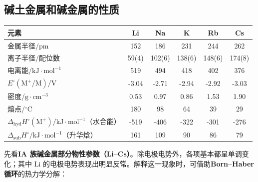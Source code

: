 \documentclass[UTF8]{ctexbook}
\begin{document}
\newpage
\subsection{碱土金属和碱金属的性质}



\noindent\begin{tabular*}{\textwidth}{@{\extracolsep{\fill}}lccccc@{}}
\toprule
元素 & Li & Na & K & Rb & Cs \\
\midrule
金属半径/pm & 152 & 186 & 231 & 244 & 262 \\
离子半径/配位数 & 59(4) & 102(6) & 138(6) & 148(6) & 174(8) \\
电离能/\(\mathrm{kJ\cdot mol^{-1}}\) & 519 & 494 & 418 & 402 & 376 \\
\(E^{\circ}(\mathrm{M^{+}/M})/\mathrm{V}\) & -3.04 & -2.71 & -2.94 & -2.92 & -3.03 \\
密度/\(\mathrm{g\cdot cm^{-3}}\) & 0.53 & 0.97 & 0.86 & 1.53 & 1.90 \\
熔点/\(^{\circ}\mathrm{C}\) & 180 & 98 & 64 & 39 & 29 \\
\(\Delta_{\mathrm{hyd}}H^{\circ}(\mathrm{M^{+}})/\mathrm{kJ\cdot mol^{-1}}\)（水合能） & -519 & -406 & -322 & -301 & -276 \\
\(\Delta_{\mathrm{sub}}H^{\circ}/\mathrm{kJ\cdot mol^{-1}}\)（升华焓） & 161 & 109 & 90 & 86 & 79 \\
\bottomrule
\end{tabular*}

先看\textbf{IA 族碱金属部分物性参数（Li--Cs）}。除电极电势外，各项基本都呈单调变化；其中 Li 的电极电势表现出明显反常。解释这一现象时，可借助\textbf{Born--Haber 循环}的热力学分解：
\end{document}
